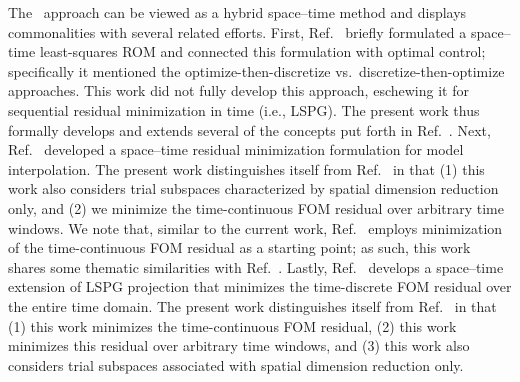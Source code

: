 \documentclass[3p,computermodern,10pt]{elsarticle}
\begin{document}
The \methodAcronym\ approach can be viewed as a hybrid space--time method and displays 
commonalities with several related efforts. 
First, Ref.~\cite{bui_thesis} briefly formulated a space--time least-squares ROM
and connected this formulation with optimal control; specifically it mentioned the
optimize-then-discretize vs.\ discretize-then-optimize approaches. This work
did not fully develop this approach, eschewing it 
for 
sequential residual minimization in time (i.e., LSPG). The present work thus
formally develops and extends several of the concepts put forth
in Ref.~\cite{bui_thesis}. Next, Ref.~\cite{constantine_strom} developed a
space--time residual minimization formulation for model interpolation.  The
present work distinguishes itself from Ref.~\cite{constantine_strom} in that
(1) this work also considers trial subspaces characterized by spatial dimension reduction only, and (2) we
minimize the time-continuous FOM residual over arbitrary time
windows. We note that,
similar to the current work, Ref.~\cite{constantine_strom} employs
minimization of the time-continuous FOM residual as a starting point; as such,
this work shares some thematic similarities with
Ref.~\cite{constantine_strom}.  Lastly, Ref.~\cite{choi_stlspg} develops a
space--time extension of LSPG projection that minimizes the time-discrete
FOM residual over the entire time domain.  The present work distinguishes
itself from Ref.~\cite{choi_stlspg} in that (1) this work minimizes the
time-continuous FOM residual, (2) this work minimizes this residual over
arbitrary time windows, and (3) this work also considers trial subspaces
associated with spatial dimension reduction only.
\end{document}
